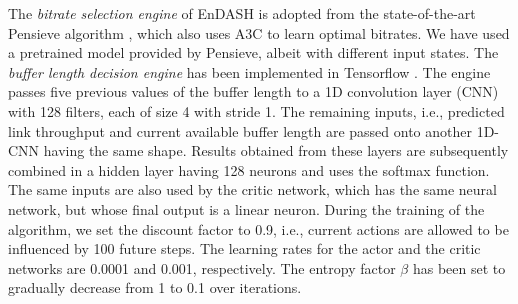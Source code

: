 The \textit{bitrate selection engine} of EnDASH is adopted from the state-of-the-art Pensieve algorithm \cite{mao2017neural}, which also uses A3C to learn optimal bitrates. We have used a pretrained model provided by Pensieve, albeit with different input states.  The \textit{buffer length decision engine} has been implemented in Tensorflow \cite{Abadi2016}. The engine passes five previous values of the buffer length to a 1D convolution layer (CNN) with 128 filters, each of size 4 with stride 1. The remaining inputs, i.e., predicted link throughput and current available buffer length are passed onto another 1D-CNN having the same shape. Results obtained from these layers are subsequently combined in a hidden layer having 128 neurons and uses the softmax function. The same inputs are also used by the critic network, which has the same neural network, but whose final output is a linear neuron. During the training of the algorithm, we set the discount factor to 0.9, i.e., current actions are allowed to be influenced by 100 future steps. The learning rates for the actor and the critic networks are 0.0001 and 0.001, respectively. The entropy factor $\beta$ has been set to gradually decrease from 1 to 0.1 over iterations.
